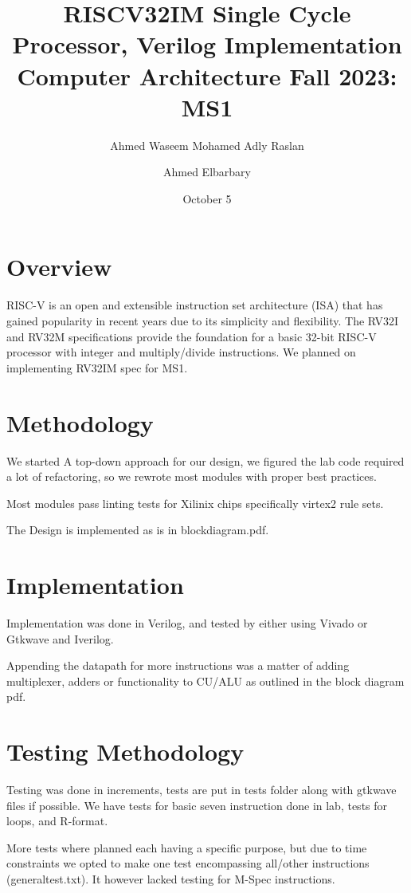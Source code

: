 \documentclass{article}
\title{RISCV32IM Single Cycle Processor, Verilog Implementation \\ \vspace{0.2cm}\normalsize Computer Architecture Fall 2023: MS1 }
\author{Ahmed Waseem Mohamed Adly Raslan \and Ahmed Elbarbary}
\date{October 5}
\begin{document}
\maketitle  
\tableofcontents

\break

\section{Overview} 
\quad RISC-V is an open and extensible instruction set architecture (ISA) that has gained popularity in recent years due to its simplicity and flexibility. The RV32I and RV32M specifications provide the foundation for a basic 32-bit RISC-V processor with integer and multiply/divide instructions. We planned on implementing RV32IM spec for MS1.

\section{Methodology} 
\quad We started A top-down approach for our design, we figured the lab code required a lot of refactoring, so we rewrote most modules with proper best practices. 

Most modules pass linting tests for Xilinix chips specifically virtex2 rule sets.  

The Design is implemented as is in blockdiagram.pdf.

\section{Implementation}
\quad Implementation was done in Verilog, and tested by either using Vivado or Gtkwave and Iverilog. 

Appending the datapath for more instructions was a matter of adding multiplexer, adders or functionality to CU/ALU as outlined in the block diagram pdf.

\section{Testing Methodology}
\quad Testing was done in increments, tests are put in tests folder along with gtkwave files if possible. We have tests for basic seven instruction done in lab, tests for loops, and R-format. 

More tests where planned each having a specific purpose, but due to time constraints we opted to make one test encompassing all/other instructions (generaltest.txt). It however lacked testing for M-Spec instructions.  
\end{document}
